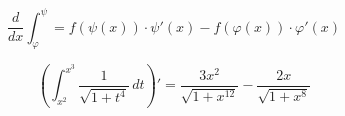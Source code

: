 \documentclass[../rgr1.tex]{subfiles}
\begin{document}

\Solution

$$
	\frac{d}{dx} \int^{\psi}_{\varphi} =
	f(\psi(x))\cdot\psi'(x) - f(\varphi(x)) \cdot \varphi'(x)
$$

\begin{dmath}
	\left( \int_{x^2}^{x^3} \frac{1}{\sqrt{1+t^4}} \,dt \right)' =
	\frac{3x^2}{\sqrt{1+x^{12}}}-\frac{2x}{\sqrt{1+x^8}}
\end{dmath}

\end{document}
